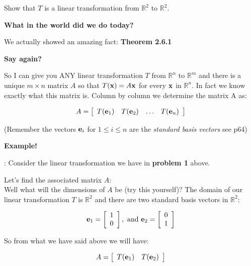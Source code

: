 \documentclass[12pt]{article}
\begin{document}
\noindent Show that $T$ is a linear transformation from $\mathbb{R}^2$ to $\mathbb{R}^2$.

\newpage
\begin{center}
{\Large \bf What in the world did we do today?}
\end{center}
\noindent We actually showed an amazing fact: {\bf Theorem 2.6.1}
\begin{center}
{\Large \bf Say again?}
\end{center}

\noindent So I can give you ANY linear transformation $T$ from $\mathbb{R}^n$ to $\mathbb{R}^m$ and there is a unique $m\times n$ matrix $A$ so that $T({\bf x})=A{\bf x}$ for every ${\bf x}$ in $\mathbb{R}^n$. In fact we know exactly what this matrix is. Column by column we determine the matrix A as:

\[ A = \left[ \begin{array}{cccc} T({\bf e}_1) & T({\bf e}_2) & \ldots & T({\bf e}_n)  \end{array} \right] \]

\noindent (Remember the vectors ${\bf e}_i$ for $1\leq i \leq n$ are the {\it standard basis vectors} see p64)

\begin{center}
{\Large \bf Example!}
\end{center}

: Consider the linear transformation we have in {\bf problem 1} above.

\noindent Let's find the associated matrix $A$:\\

\noindent Well what will the dimensions of $A$ be (try this yourself)?  The domain of our linear transformation $T$ is $\mathbb{R}^2$ and there are two standard basis vectors in $\mathbb{R}^2$:

\[ {\bf e}_1 = \left[ \begin{array}{c} 1 \\ 0  \end{array} \right] ,\text{ and } {\bf e}_2 = \left[ \begin{array}{c} 0 \\ 1  \end{array} \right]\]

\noindent So from what we have said above we will have:

\[ A = \left[ \begin{array}{cc} T({\bf e}_1) & T({\bf e}_2) \end{array} \right]  \]
\end{document}
